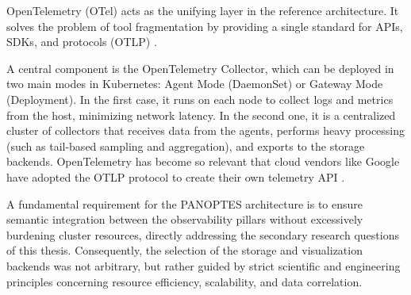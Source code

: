 OpenTelemetry (OTel) acts as the unifying layer in the reference architecture. It solves the problem of tool fragmentation by providing a single standard for APIs, SDKs, and protocols (OTLP) \cite{flanders_2024}.

A central component is the OpenTelemetry Collector, which can be deployed in two main modes in Kubernetes: Agent Mode (DaemonSet) or Gateway Mode (Deployment). In the first case, it runs on each node to collect logs and metrics from the host, minimizing network latency. In the second one, it is a centralized cluster of collectors that receives data from the agents, performs heavy processing (such as tail-based sampling and aggregation), and exports to the storage backends. OpenTelemetry has become so relevant that cloud vendors like Google have adopted the OTLP protocol to create their own telemetry API \cite{google_cloud_observability_2024}.

A fundamental requirement for the PANOPTES architecture is to ensure semantic integration between the observability pillars without excessively burdening cluster resources, directly addressing the secondary research questions of this thesis. Consequently, the selection of the storage and visualization backends was not arbitrary, but rather guided by strict scientific and engineering principles concerning resource efficiency, scalability, and data correlation.

